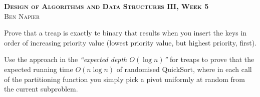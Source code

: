 \documentclass[a4paper, answers]{exam}
\begin{document}
\begin{center}
	\textbf{\textsc{Design of Algorithms and Data Structures III, Week 5}} \\
	\textsc{Ben Napier}
	\vspace{1em}
\end{center}

\begin{questions}
	\question
	Prove that a treap is exactly te binary that results when you insert
	the keys in order of increasing priority value
	(lowest priority value, but highest priority, first).

	\question
	Use the approach in the \emph{``expected depth $O(\log n)$''}
	for treaps to prove that the expected running time $O(n\log n)$ of
	randomised QuickSort, where in each call of the partitioning function
	you simply pick a pivot uniformly at random from the current
	subproblem.
\end{questions}
\end{document}
